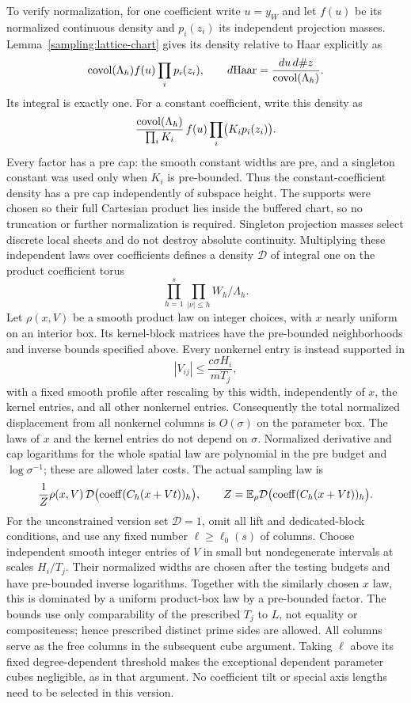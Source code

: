 To verify normalization, for one coefficient write $u=y_W$ and let
$f(u)$ be its normalized continuous density and $p_i(z_i)$ its independent
projection masses.  Lemma~\ref{sampling:lattice-chart} gives its density
relative to Haar explicitly as
\[
 \operatorname{covol}(\Lambda_h)f(u)\prod_i p_i(z_i),
 \qquad
 d\mathrm{Haar}=\frac{du\,d\#z}{\operatorname{covol}(\Lambda_h)}.
\]
Its integral is exactly one.  For a constant coefficient, write this density as
\[
 \frac{\operatorname{covol}(\Lambda_h)}{\prod_iK_i}\,f(u)\prod_i\bigl(K_ip_i(z_i)\bigr).
\]
Every factor has a pre cap: the smooth constant widths are pre, and a
singleton constant was used only when $K_i$ is pre-bounded.  Thus the
constant-coefficient density has a pre cap independently of subspace height.
The supports were chosen so their full
Cartesian product lies inside the buffered chart, so no truncation or
further normalization is required.  Singleton projection masses select
discrete local sheets and do not destroy absolute continuity.  Multiplying
these independent laws over coefficients defines a density $\mathcal D$
of integral one on the
product coefficient torus
\[
 \prod_{h=1}^s\prod_{|\nu|\le h}W_h/\Lambda_h.
\]
Let $\rho(x,V)$ be a smooth product law on integer choices, with $x$ nearly
uniform on an interior box.  Its kernel-block matrices have the
pre-bounded neighborhoods and inverse bounds specified above.  Every
nonkernel entry is instead supported in
\begin{equation}\label{sampling:nonkernel-support}
 |V_{ij}|\le \frac{c\sigma H_i}{mT_j},
\end{equation}
with a fixed smooth profile after rescaling by this width, independently
of $x$, the kernel entries, and all other nonkernel entries.  Consequently
the total normalized displacement from all nonkernel columns is
$O(\sigma)$ on the parameter box.  The laws of $x$ and the kernel
entries do not depend on $\sigma$.  Normalized derivative and cap
logarithms for the whole spatial law are polynomial in the pre budget
and $\log\sigma^{-1}$; these are allowed later costs.  The actual
sampling law is
\begin{equation}\label{sampling:tilted-law}
 \frac1Z\rho(x,V)\,
 \mathcal D\bigl(\operatorname{coeff}(C_h(x+Vt))_{h}\bigr),
 \qquad
 Z=\mathbb E_\rho\mathcal D\bigl(\operatorname{coeff}(C_h(x+Vt))_{h}\bigr).
\end{equation}
For the unconstrained version set $\mathcal D=1$, omit all lift and
dedicated-block conditions, and use any fixed number
$\ell\ge\ell_0(s)$ of columns.  Choose independent smooth integer
entries of $V$ in small but nondegenerate intervals at scales $H_i/T_j$.
Their normalized widths are chosen after the testing budgets and have
pre-bounded inverse logarithms.  Together with the similarly chosen $x$
law, this is dominated by a uniform product-box law by a pre-bounded
factor.  The bounds use only comparability of the prescribed $T_j$ to
$L$, not equality or compositeness; hence prescribed distinct prime sides
are allowed.  All columns serve as the free columns in the subsequent
cube argument.  Taking $\ell$ above its fixed degree-dependent threshold
makes the exceptional dependent parameter cubes negligible, as in that
argument.  No coefficient tilt or special axis lengths need to be selected
in this version.

